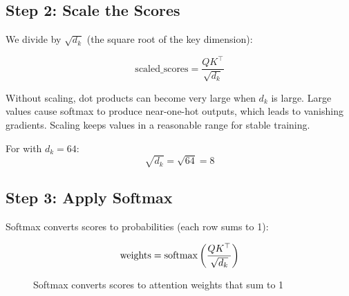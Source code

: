 \subsection{Step 2: Scale the Scores}

We divide by $\sqrt{d_k}$ (the square root of the key dimension):

\[
\text{scaled\_scores} = \frac{Q K^\top}{\sqrt{d_k}}
\]

\begin{keypoint}[title=Why Scale?]
Without scaling, dot products can become very large when $d_k$ is large. Large values cause softmax to produce near-one-hot outputs, which leads to vanishing gradients. Scaling keeps values in a reasonable range for stable training.
\end{keypoint}

For \TryLM with $d_k = 64$:
\[
\sqrt{d_k} = \sqrt{64} = 8
\]

\subsection{Step 3: Apply Softmax}

Softmax converts scores to probabilities (each row sums to 1):

\[
\text{weights} = \operatorname{softmax}\left(\frac{Q K^\top}{\sqrt{d_k}}\right)
\]

\begin{figure}[H]
\centering
{}
\caption{Softmax converts scores to attention weights that sum to 1}
\label{fig:softmax}
\end{figure}

